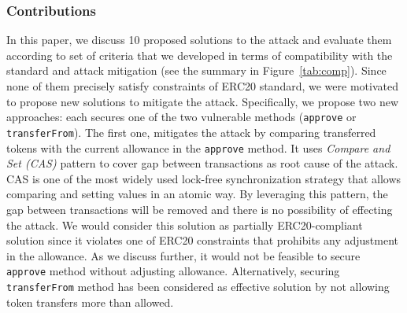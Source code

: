 \subsubsection*{Contributions} In this paper, we discuss 10 proposed solutions to the attack and evaluate them according to set of criteria that we developed in terms of compatibility with the standard and attack mitigation (see the summary in Figure~\ref{tab:comp}). Since none of them precisely satisfy constraints of ERC20 standard, we were motivated to propose new solutions to mitigate the attack. Specifically, we propose two new approaches: each secures one of the two vulnerable methods (\ie \texttt{approve} or \texttt{transferFrom}). The first one, mitigates the attack by comparing transferred tokens with the current allowance in the \texttt{approve} method. It uses \textit{Compare and Set (CAS)} pattern\cite{Ref06} to cover gap between transactions as root cause of the attack. CAS is one of the most widely used lock-free synchronization strategy that allows comparing and setting values in an atomic way. By leveraging this pattern, the gap between transactions will be removed and there is no possibility of effecting the attack. We would consider this solution as partially ERC20-compliant solution since it violates one of ERC20 constraints that prohibits any adjustment in the allowance. As we discuss further, it would not be feasible to secure \texttt{approve} method without adjusting allowance. Alternatively, securing \texttt{transferFrom} method has been considered as effective solution by not allowing token transfers more than allowed.

